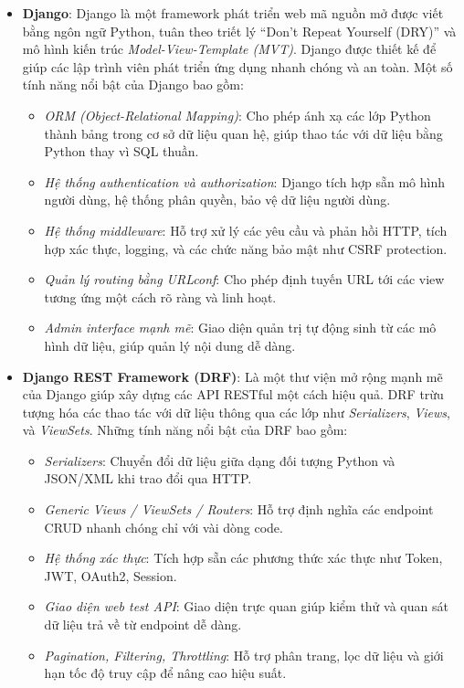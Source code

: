 \begin{itemize}

    \item \textbf{Django}: 
    Django là một framework phát triển web mã nguồn mở được viết bằng ngôn ngữ Python, tuân theo triết lý ``Don't Repeat Yourself (DRY)'' và mô hình kiến trúc \textit{Model-View-Template (MVT)}. Django được thiết kế để giúp các lập trình viên phát triển ứng dụng nhanh chóng và an toàn. Một số tính năng nổi bật của Django bao gồm:
    \begin{itemize}
        \item \textit{ORM (Object-Relational Mapping)}: Cho phép ánh xạ các lớp Python thành bảng trong cơ sở dữ liệu quan hệ, giúp thao tác với dữ liệu bằng Python thay vì SQL thuần.
        \item \textit{Hệ thống authentication và authorization}: Django tích hợp sẵn mô hình người dùng, hệ thống phân quyền, bảo vệ dữ liệu người dùng.
        \item \textit{Hệ thống middleware}: Hỗ trợ xử lý các yêu cầu và phản hồi HTTP, tích hợp xác thực, logging, và các chức năng bảo mật như CSRF protection.
        \item \textit{Quản lý routing bằng URLconf}: Cho phép định tuyến URL tới các view tương ứng một cách rõ ràng và linh hoạt.
        \item \textit{Admin interface mạnh mẽ}: Giao diện quản trị tự động sinh từ các mô hình dữ liệu, giúp quản lý nội dung dễ dàng.
    \end{itemize}

    \item \textbf{Django REST Framework (DRF)}:
    Là một thư viện mở rộng mạnh mẽ của Django giúp xây dựng các API RESTful một cách hiệu quả. DRF trừu tượng hóa các thao tác với dữ liệu thông qua các lớp như \textit{Serializers}, \textit{Views}, và \textit{ViewSets}. Những tính năng nổi bật của DRF bao gồm:
    \begin{itemize}
        \item \textit{Serializers}: Chuyển đổi dữ liệu giữa dạng đối tượng Python và JSON/XML khi trao đổi qua HTTP.
        \item \textit{Generic Views / ViewSets / Routers}: Hỗ trợ định nghĩa các endpoint CRUD nhanh chóng chỉ với vài dòng code.
        \item \textit{Hệ thống xác thực}: Tích hợp sẵn các phương thức xác thực như Token, JWT, OAuth2, Session.
        \item \textit{Giao diện web test API}: Giao diện trực quan giúp kiểm thử và quan sát dữ liệu trả về từ endpoint dễ dàng.
        \item \textit{Pagination, Filtering, Throttling}: Hỗ trợ phân trang, lọc dữ liệu và giới hạn tốc độ truy cập để nâng cao hiệu suất.
    \end{itemize}


\end{itemize}
